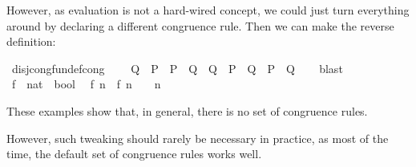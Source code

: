 \begin{isabellebody}
\begin{isamarkuptext}
  However, as evaluation is not a hard-wired concept, we
  could just turn everything around by declaring a different
  congruence rule. Then we can make the reverse definition:%
\end{isamarkuptext}%
\isamarkuptrue%
\isamarkupfalse%
\ disj{\isacharunderscore}cong{}{\isacharbrackleft}fundef{\isacharunderscore}cong{\isacharbrackright}{\isacharcolon}\ \isanewline
\ \ {\isachardoublequoteopen}{\isacharparenleft}{\isasymnot}\ Q{\isacharprime}\ {\isasymLongrightarrow}\ P\ {\isacharequal}\ P{\isacharprime}{\isacharparenright}\ {\isasymLongrightarrow}\ {\isacharparenleft}Q\ {\isacharequal}\ Q{\isacharprime}{\isacharparenright}\ {\isasymLongrightarrow}\ {\isacharparenleft}P\ {\isasymor}\ Q{\isacharparenright}\ {\isacharequal}\ {\isacharparenleft}P{\isacharprime}\ {\isasymor}\ Q{\isacharprime}{\isacharparenright}{\isachardoublequoteclose}\isanewline
%
\isadelimproof
\ \ %
\endisadelimproof
%
\isatagproof
{}\isamarkupfalse%
\ blast%
\endisatagproof
{\isafoldproof}%
%
\isadelimproof
\isanewline
%
\endisadelimproof
\isanewline
{}\isamarkupfalse%
\ f{\isacharprime}\ {\isacharcolon}{\isacharcolon}\ {\isachardoublequoteopen}nat\ {\isasymRightarrow}\ bool{\isachardoublequoteclose}\isanewline
{}\isanewline
\ \ {\isachardoublequoteopen}f{\isacharprime}\ n\ {\isacharequal}\ {\isacharparenleft}f{\isacharprime}\ {\isacharparenleft}n\ {\isacharminus}\ {}{\isacharparenright}\ {\isasymor}\ n\ {\isacharequal}\ {}{\isacharparenright}{\isachardoublequoteclose}%
\begin{isamarkuptext}%
\noindent These examples show that, in general, there is no  set of
  congruence rules.

  However, such tweaking should rarely be necessary in
  practice, as most of the time, the default set of congruence rules
  works well.%
\end{isamarkuptext}%
\isamarkuptrue%
%
\isadelimtheory
%
\endisadelimtheory
%
\isatagtheory
{}\isamarkupfalse%
%
\endisatagtheory
{\isafoldtheory}%
%
\isadelimtheory
%
\endisadelimtheory
\isanewline
\end{isabellebody}%
